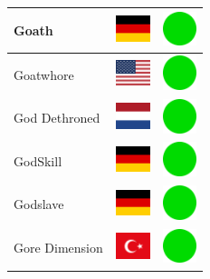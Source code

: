 \documentclass[12pt, a4paper, twoside]{report}
\begin{document}
\begin{center}
\begin{longtable}{|p{5cm}|p{2cm}|p{2cm}|}
 Goath                                                      & \includegraphics[width=1cm]{../4x3/de} &   \includegraphics[width=1cm]{../likes/y} \\ \hline
 Goatwhore                                                  & \includegraphics[width=1cm]{../4x3/us} &   \includegraphics[width=1cm]{../likes/y} \\ \hline
 God Dethroned                                              & \includegraphics[width=1cm]{../4x3/nl} &   \includegraphics[width=1cm]{../likes/y} \\ \hline
 GodSkill                                                   & \includegraphics[width=1cm]{../4x3/de} &   \includegraphics[width=1cm]{../likes/y} \\ \hline
 Godslave                                                   & \includegraphics[width=1cm]{../4x3/de} &   \includegraphics[width=1cm]{../likes/y} \\ \hline
 Gore Dimension                                             & \includegraphics[width=1cm]{../4x3/tr} &   \includegraphics[width=1cm]{../likes/y} \\ \hline

\end{longtable}
\end{center}
\end{document}
